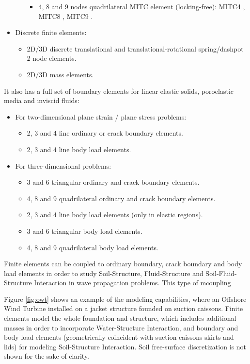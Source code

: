 \documentclass[a4paper,fleqn]{book}
\begin{document}
\begin{itemize}
\begin{itemize}
\begin{itemize}
            \item 4, 8 and 9 nodes quadrilateral MITC element (locking-free): MITC4 \cite{dvorkin1984}, MITC8 \cite{Bathe1986}, MITC9 \cite{Bucalem1993}.
        \end{itemize}
    \end{itemize}
    \item Discrete finite elements:
    \begin{itemize}
        \item 2D/3D discrete translational and translational-rotational spring/dashpot 2 node elements.
        \item 2D/3D mass elements.
    \end{itemize}
\end{itemize}

It also has a full set of boundary elements for linear elastic solids, poroelastic media and inviscid fluids:
\begin{itemize}
    \item For two-dimensional plane strain / plane stress problems:
    \begin{itemize}
        \item 2, 3 and 4 line ordinary or crack boundary elements.
        \item 2, 3 and 4 line body load elements.
    \end{itemize}
    \item For three-dimensional problems:
    \begin{itemize}
        \item 3 and 6 triangular ordinary and crack boundary elements.
        \item 4, 8 and 9 quadrilateral ordinary and crack boundary elements.
        \item 2, 3 and 4 line body load elements (only in elastic regions).
        \item 3 and 6 triangular body load elements.
        \item 4, 8 and 9 quadrilateral body load elements.        
    \end{itemize}
\end{itemize}

Finite elements can be coupled to ordinary boundary, crack boundary and body load elements in order to study Soil-Structure, Fluid-Structure and Soil-Fluid-Structure Interaction in wave propagation problems. This type of mcoupling

Figure \ref{fig:owt} shows an example of the modeling capabilities, where an Offshore Wind Turbine installed on a jacket structure founded on suction caissons. Finite elements model the whole foundation and structure, which includes additional masses in order to incorporate Water-Structure Interaction, and boundary and body load elements (geometrically coincident with suction caissons skirts and lids) for modeling Soil-Structure Interaction. Soil free-surface discretization is not shown for the sake of clarity.
\end{document}
